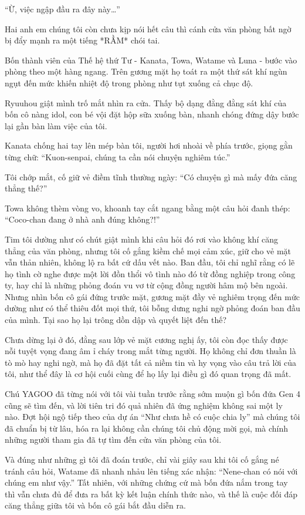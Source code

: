 \documentclass[../main.tex]{subfiles}
\begin{document}
``Ừ, việc ngập đầu ra đây này\dots''

Hai anh em chúng tôi còn chưa kịp nói hết câu thì cánh cửa văn phòng bất ngờ bị đẩy mạnh ra một tiếng *RẦM* chói tai.

Bốn thành viên của Thế hệ thứ Tư - Kanata, Towa, Watame và Luna - bước vào phòng theo một hàng ngang. Trên gương mặt họ toát ra một thứ sát khí ngùn ngụt đến mức khiến nhiệt độ trong phòng như tụt xuống cả chục độ.

Ryuuhou giật mình trố mắt nhìn ra cửa. Thấy bộ dạng đằng đằng sát khí của bốn cô nàng idol, con bé vội đặt hộp sữa xuống bàn, nhanh chóng đứng dậy bước lại gần bàn làm việc của tôi.

Kanata chống hai tay lên mép bàn tôi, người hơi nhoài về phía trước, giọng gằn từng chữ: ``Kuon-senpai, chúng ta cần nói chuyện nghiêm túc.''

Tôi chớp mắt, cố giữ vẻ điềm tĩnh thường ngày: ``Có chuyện gì mà mấy đứa căng thẳng thế?''

Towa không thèm vòng vo, khoanh tay cắt ngang bằng một câu hỏi đanh thép: ``Coco-chan đang ở nhà anh đúng không?!''

Tim tôi dường như có chút giật mình khi câu hỏi đó rơi vào không khí căng thẳng của văn phòng, nhưng tôi cố gắng kiềm chế mọi cảm xúc, giữ cho vẻ mặt vẫn thản nhiên, không lộ ra bất cứ dấu vết nào. Ban đầu, tôi chỉ nghĩ rằng có lẽ họ tình cờ nghe được một lời đồn thổi vô tình nào đó từ đồng nghiệp trong công ty, hay chỉ là những phỏng đoán vu vơ từ cộng đồng người hâm mộ bên ngoài. Nhưng nhìn bốn cô gái đứng trước mặt, gương mặt đầy vẻ nghiêm trọng đến mức dường như có thể thiêu đốt mọi thứ, tôi bỗng dưng nghi ngờ phỏng đoán ban đầu của mình. Tại sao họ lại trông dồn dập và quyết liệt đến thế?

Chưa dừng lại ở đó, đằng sau lớp vẻ mặt cương nghị ấy, tôi còn đọc thấy được nỗi tuyệt vọng đang âm ỉ cháy trong mắt từng người. Họ không chỉ đơn thuần là tò mò hay nghi ngờ, mà họ đã đặt tất cả niềm tin và hy vọng vào câu trả lời của tôi, như thể đây là cơ hội cuối cùng để họ lấy lại điều gì đó quan trọng đã mất.

Chú YAGOO đã từng nói với tôi vài tuần trước rằng sớm muộn gì bốn đứa Gen 4 cũng sẽ tìm đến, và lời tiên tri đó quả nhiên đã ứng nghiệm không sai một ly nào. Đợt hội ngộ tiếp theo của dự án ``Như chưa hề có cuộc chia ly'' mà chúng tôi đã chuẩn bị từ lâu, hóa ra lại không cần chúng tôi chủ động mời gọi, mà chính những người tham gia đã tự tìm đến cửa văn phòng của tôi.

Và đúng như những gì tôi đã đoán trước, chỉ vài giây sau khi tôi cố gắng né tránh câu hỏi, Watame đã nhanh nhảu lên tiếng xác nhận: ``Nene-chan có nói với chúng em như vậy.'' Tất nhiên, với những chứng cứ mà bốn đứa nắm trong tay thì vẫn chưa đủ để đưa ra bất kỳ kết luận chính thức nào, và thế là cuộc đối đáp căng thẳng giữa tôi và bốn cô gái bắt đầu diễn ra.
\end{document}
